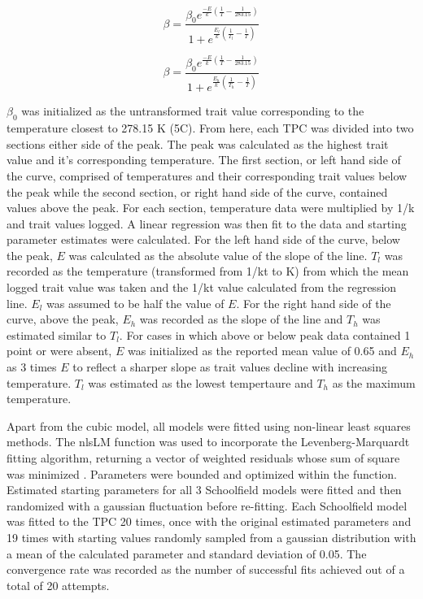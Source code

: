 \documentclass[11pt]{article}
\begin{document}
\begin{linenumbers}
\begin{equation}
\beta = \frac{\beta_0 e^{\frac{-E}{k} (\frac{1}{T} - \frac{1}{283.15})}}
{ 1  + e^{\frac{E_l}{k} (\frac{1}{T_l} - \frac{1}{T})}}\tag{4}
\end{equation}

\begin{equation}
\beta = \frac{\beta_0 e^{\frac{-E}{k} (\frac{1}{T} - \frac{1}{283.15})}}
{ 1  + e^{\frac{E_h}{k} (\frac{1}{T_h} - \frac{1}{T})}}\tag{5}
\end{equation}

\vspace{0.1cm}
\(\beta_0\) was initialized as the untransformed trait value corresponding to the temperature closest to 278.15 K (5\degree C). From here, each TPC was divided into two sections either side of the peak. The peak was calculated as the highest trait value and it's corresponding temperature. The first section, or left hand side of the curve, comprised of temperatures and their corresponding trait values below the peak while the second section, or right hand side of the curve, contained values above the peak. For each section, temperature data were multiplied by 1/k and trait values logged. A linear regression was then fit to the data and starting parameter estimates were calculated. For the left hand side of the curve, below the peak, \(E\) was calculated as the absolute value of the slope of the line. \(T_l\) was recorded as the temperature (transformed from 1/kt to K) from which the mean logged trait value was taken and the 1/kt value calculated from the regression line. \(E_l\) was assumed to be half the value of \(E\). For the right hand side of the curve, above the peak, \(E_h \) was recorded as the slope of the line and \(T_h\) was estimated similar to \(T_l\). For cases in which above or below peak data contained 1 point or were absent, \(E\) was initialized as the reported mean value of 0.65 \cite{pub.1026914980} and \(E_h \) as 3 times \(E\) to reflect a sharper slope as trait values decline with increasing temperature. \(T_l\) was estimated as the lowest tempertaure and \(T_h\) as the maximum temperature.

Apart from the cubic model, all models were fitted using non-linear least squares methods. The nlsLM function was used to incorporate the Levenberg-Marquardt fitting algorithm, returning a vector of weighted residuals whose sum of square was minimized \cite{minpack}. Parameters were bounded and optimized within the function. Estimated starting parameters for all 3 Schoolfield models were fitted and then randomized with a gaussian fluctuation before re-fitting. Each Schoolfield model was fitted to the TPC 20 times, once with the original estimated parameters and 19 times with starting values randomly sampled from a gaussian distribution with a mean of the calculated parameter and standard deviation of 0.05. The convergence rate was recorded as the number of successful fits achieved out of a total of 20 attempts. 


\end{linenumbers}
\end{document}
